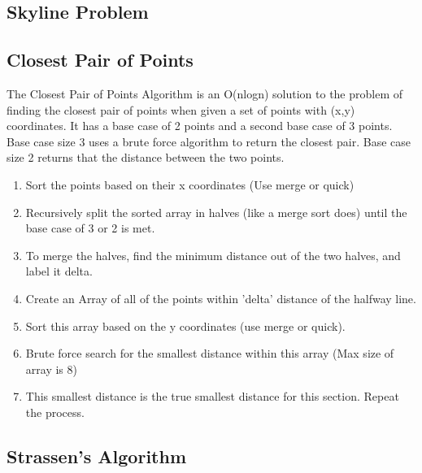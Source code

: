 
\subsection*{Skyline Problem}
\lipsum[1][1-2]
\subsection*{Closest Pair of Points}
The Closest Pair of Points Algorithm is an O(nlogn) solution to the problem of finding the closest pair of points
when given a set of points with (x,y) coordinates. It has a base case of 2 points and a second base case of 3 points.
Base case size 3 uses a brute force algorithm to return the closest pair. Base case size 2 returns that the distance between the two points.
\begin{enumerate}
    \item Sort the points based on their x coordinates (Use merge or quick)
    \item Recursively split the sorted array in halves (like a merge sort does) until the base case of 3 or 2 is met.
    \item To merge the halves, find the minimum distance out of the two halves, and label it delta. 
    \item Create an Array of all of the points within 'delta' distance of the halfway line.
    \item Sort this array based on the y coordinates (use merge or quick).
    \item Brute force search for the smallest distance within this array (Max size of array is 8) 
    \item This smallest distance is the true smallest distance for this section. Repeat the process.
\end{enumerate}
\subsection*{Strassen's Algorithm}
\lipsum[1][1-2]
